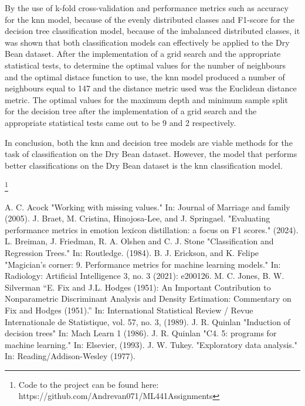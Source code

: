 \documentclass[10pt, conference]{IEEEtran}
\begin{document}
By the use of k-fold cross-validation and performance metrics such as accuracy for the \acrshort{knn} model, because of the evenly
distributed classes and F1-score for the decision tree classification model, because of the imbalanced distributed classes,
it was shown that both classification models can effectively be applied to the Dry Bean dataset. After the implementation
of a grid search and the appropriate statistical tests, to determine the optimal values for the number of neighbours and the optimal
distace function to use, the \acrshort{knn} model produced a number of neighbours equal to 147 and the distance metric used was
the Euclidean distance metric. The optimal values for the maximum depth and minimum sample split for the decision tree after
the implementation of a grid search and the appropriate statistical tests came out to be 9 and 2 respectively.

In conclusion, both the \acrshort{knn} and decision tree models are viable methods for the task of classification on the Dry Bean dataset.
However, the model that performs better classifications on the Dry Bean dataset is the \acrshort{knn} classification model.

\footnote{Code to the project can be found here: https://github.com/Andrevan071/ML441Assignments}

\begin{thebibliography}{00}
     A. C. Acock "Working with missing values." In: Journal of Marriage and family (2005).
     J. Braet, M. Cristina, Hinojosa-Lee, and J. Springael. "Evaluating performance metrics in emotion lexicon distillation: a focus on F1 scores." (2024).
     L. Breiman, J. Friedman, R. A. Olshen and C. J. Stone "Classification and Regression Trees." In: Routledge.  (1984).
     B. J. Erickson, and K. Felipe "Magician’s corner: 9. Performance metrics for machine learning models." In: Radiology: Artificial Intelligence 3, no. 3 (2021): e200126.
     M. C. Jones, B. W. Silverman “E. Fix and J.L. Hodges (1951): An Important Contribution to Nonparametric Discriminant Analysis and Density Estimation: Commentary on Fix and Hodges (1951).” In: International Statistical Review / Revue Internationale de Statistique, vol. 57, no. 3, (1989).
     J. R. Quinlan "Induction of decision trees" In: Mach Learn 1 (1986).
     J. R. Quinlan "C4. 5: programs for machine learning." In: Elsevier, (1993).
     J. W. Tukey. "Exploratory data analysis." In: Reading/Addison-Wesley (1977).
\end{thebibliography}


\printglossary[type=\acronymtype]
\end{document}
